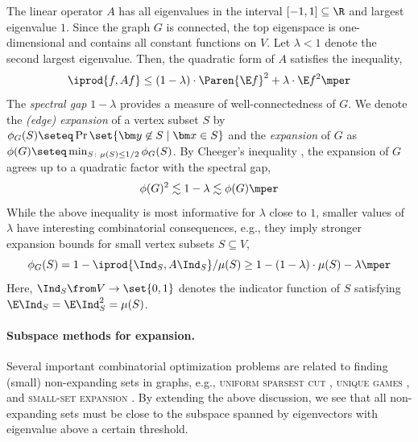 The linear operator \(A\) has all eigenvalues in the interval \([-1,1]\subseteq \R\) and largest eigenvalue \(1\).
Since the graph \(G\) is connected, the top eigenspace is one-dimensional and contains all constant functions on \(V\).
Let \(\lambda<1\) denote the second largest eigenvalue.
Then, the quadratic form of \(A\) satisfies the inequality,
\begin{equation}
  \iprod{f,Af}\le (1-\lambda)\cdot \Paren{\E f}^{2} + \lambda \cdot \E f^{2}
  \mper
\end{equation}
The \emph{spectral gap} \(1-\lambda\) provides a measure of well-connectedness of \(G\).
We denote the \emph{(edge) expansion} of a vertex subset \(S\) by \(\phi_{G}(S)\seteq \Pr\set{\bm y\not \in S\mid \bm x\in S}\) and the \emph{expansion} of \(G\) as \(\phi(G)\seteq \min_{S\colon \mu(S)\le 1/2 } \phi_{G}(S)\).
By Cheeger's inequality \cite{cheeger, alon-milman}, the expansion of \(G\) agrees up to a quadratic factor with the spectral gap,
\begin{equation}
  \phi(G)^{2}
  \lesssim 1-\lambda
  \lesssim \phi(G)
  \mper
\end{equation}
While the above inequality is most informative for \(\lambda\) close to \(1\), smaller values of \(\lambda\) have interesting combinatorial consequences, e.g., they imply stronger expansion bounds for small vertex subsets \(S\subseteq V\),
\begin{equation}
  \phi_{G}(S)
  = 1-\iprod{\Ind_{S},A \Ind_{S}} / \mu(S)
  \ge 1- (1-\lambda)\cdot \mu(S) - \lambda
  \mper
\end{equation}
Here, \(\Ind_{S}\from V\to \set{0,1}\) denotes the indicator function of \(S\) satisfying \(\E \Ind_{S}=\E\Ind_{S}^{2}=\mu(S)\).

\paragraph{Subspace methods for expansion.}

Several important combinatorial optimization problems are related to finding (small) non-expanding sets in graphs, e.g., \textsc{uniform sparsest cut} \cite{leighton-rao,arora-rao-vazirani}, \textsc{unique games} \cite{khot, arora-barak-steurer, raghavendra-steurer}, and \textsc{small-set expansion} \cite{raghavendra-steurer, raghavendra-steurer-tetali}.
By extending the above discussion, we see that all non-expanding sets must be close to the subspace spanned by eigenvectors with eigenvalue above a certain threshold.

